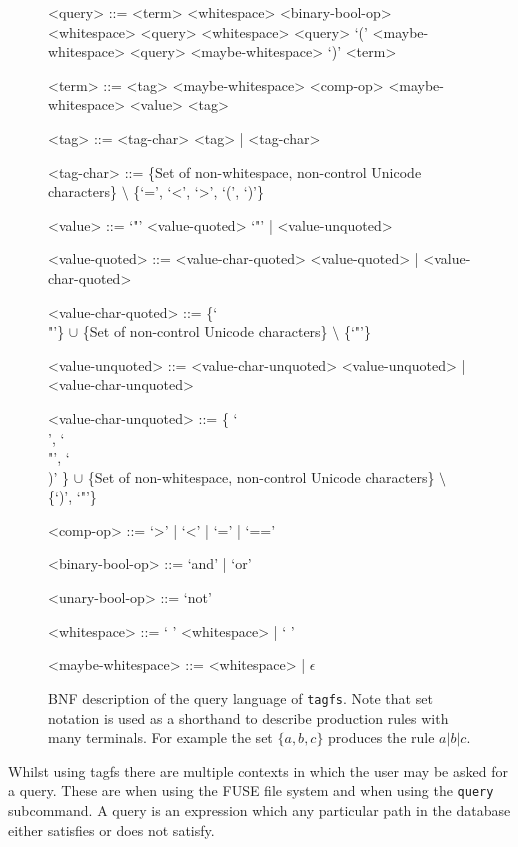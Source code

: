 \begin{figure}[t]
\begin{grammar}
<query> ::= <term> <whitespace> <binary-bool-op> <whitespace> <query>
     <whitespace> <query>
    \alt `(' <maybe-whitespace> <query> <maybe-whitespace> `)'
    \alt <term>

<term> ::= <tag> <maybe-whitespace> <comp-op> <maybe-whitespace> <value>
    \alt <tag>

<tag> ::= <tag-char> <tag> | <tag-char>

<tag-char> ::= \{Set of non-whitespace, non-control Unicode characters\}
    $\setminus$ \{`=', `<', `>', `(', `)'\}

<value> ::= `"' <value-quoted> `"' | <value-unquoted>

<value-quoted> ::= <value-char-quoted> <value-quoted>
    | <value-char-quoted>

    <value-char-quoted> ::= \{`\\"'\} $\cup$ \{Set of non-control Unicode
        characters\} $\setminus$ \{`"'\}

<value-unquoted> ::= <value-char-unquoted> <value-unquoted>
    | <value-char-unquoted>

<value-char-unquoted> ::= \{ `\\ ', `\\"', `\\)' \} $\cup$ \{Set of
    non-whitespace, non-control Unicode characters\} $\setminus$ \{`)', `"'\}

<comp-op> ::= `>' | `<' | `=' | `=='

<binary-bool-op> ::= `and' | `or'

<unary-bool-op> ::= `not'

<whitespace> ::= ` ' <whitespace> | ` '

<maybe-whitespace> ::= <whitespace> | $\epsilon$

\end{grammar}
\label{fig:query-bnf}
\caption[BNF description of the query language of \texttt{tagfs}]
    {BNF description of the query language of \texttt{tagfs}. Note that set
    notation is used as a shorthand to describe production rules with many
    terminals. For example the set $\{a, b, c\}$ produces the rule $a \vert b
    \vert c$. }
\end{figure}

Whilst using tagfs there are multiple contexts in which the user may be asked
for a query. These are when using the FUSE file system and when using the
\texttt{query} subcommand. A query is an expression which any particular path
in the database either satisfies or does not satisfy.

